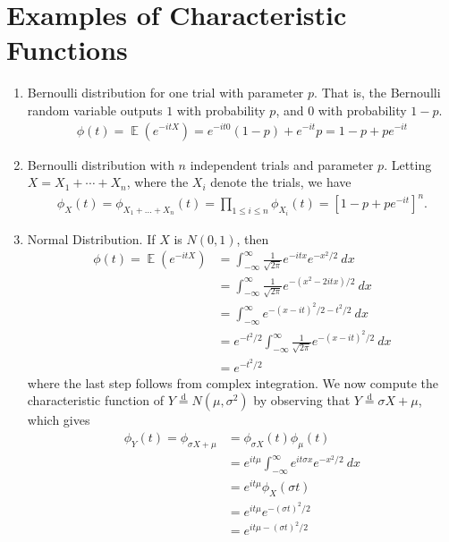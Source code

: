 \documentclass[12pt]{amsbook}
\DeclareMathOperator{\ex}{\mathbb{E}}
\theoremstyle{plain}
\theoremstyle{definition}
\theoremstyle{remark}
\numberwithin{equation}{section}  %
\numberwithin{equation}{section}  %
\begin{document}
	\section{Examples of Characteristic Functions}
	\begin{enumerate}
		\item Bernoulli distribution for one trial with parameter $p$. That is,
			the Bernoulli random variable outputs $1$ with probability $p$,
			and $0$ with probability $1-p$.
			\begin{equation*}
				\begin{split}
					\phi(t) = \ex(e^{-itX}) = e^{-it0}(1-p) + e^{-it}p = 1-p + pe^{-it}
				\end{split}
			\end{equation*}
		\item Bernoulli distribution with $n$ independent trials and parameter
			$p$. Letting $X = X_{1} + \cdots + X_{n}$, where the $X_i$ denote
			the trials, we have
			\begin{equation*}
				\begin{split}
					\phi_{X}(t) = \phi_{X_{1} + \ldots + X_{n}}(t)
					= \prod_{1 \le i \le n} \phi_{X_{i}}(t)
					= \left[ 1-p + pe^{-it} \right]^{n}.
				\end{split}
			\end{equation*}
		\item Normal Distribution. If $X$ is $N(0,1)$, then
			\begin{equation*}
				\begin{split}
					\phi(t) = \ex(e^{-itX})
					& = \int_{-\infty}^{\infty} \frac{1}{\sqrt{2 \pi}} e^{-itx}
					e^{-x^{2}/2} \ dx
					\\
					& = \int_{-\infty}^{\infty}\frac{1}{\sqrt{2 \pi}} e^{-(x^{2} -2itx)/2} \
					dx
					\\
					& = \int_{-\infty}^{\infty} e^{-(x-it)^{2}/2 - t^{2}/2} \ dx
					\\
					& = e^{-t^{2}/2} \int_{-\infty}^{\infty} \frac{1}{\sqrt{2 \pi}}
					e^{-(x - it)^{2}/2} \ dx
					\\
					& = e^{-t^{2}/2}
				\end{split}
			\end{equation*}
			where the last step follows from complex integration.	
			We now compute the characteristic function of $Y \overset{\text{d}}{=}N(\mu,
			\sigma^{2})$ by observing that $Y \overset{\text{d}}{=} \sigma X + \mu$,
			which gives
			\begin{equation*}
				\begin{split}
					\phi_{Y}(t) = \phi_{\sigma X + \mu}
					& =  \phi_{\sigma X}(t) \phi_{\mu}(t)
					\\
					& = e^{it\mu} \int_{-\infty}^{\infty} e^{i t \sigma x} e^{-x^{2}/2} \ dx
					\\
					& = e^{it \mu} \phi_{X}(\sigma t)
					\\
					& = e^{it \mu} e^{-( \sigma t)^{2}/2}
					\\
					& = e^{it \mu - (\sigma t)^{2}/2}
				\end{split}
			\end{equation*}
	\end{enumerate}
\end{document}
